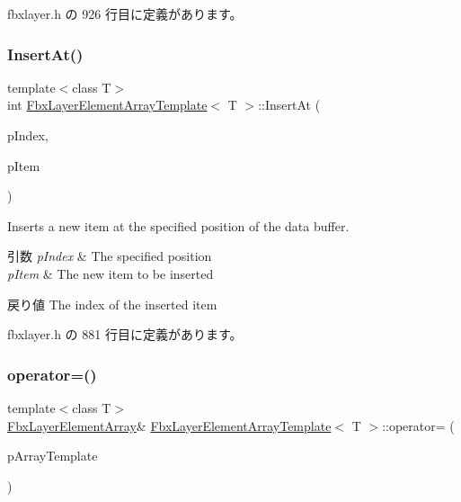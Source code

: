  fbxlayer.\+h の 926 行目に定義があります。

\mbox{\label{class_fbx_layer_element_array_template_adaf1260a3a9f1c68f9809ddaf051ac61}} 
\subsubsection{\texorpdfstring{Insert\+At()}{InsertAt()}}
{\footnotesize\ttfamily template$<$class T$>$ \\
int \hyperlink{class_fbx_layer_element_array_template}{Fbx\+Layer\+Element\+Array\+Template}$<$ T $>$\+::Insert\+At (\begin{DoxyParamCaption}\item[{int}]{p\+Index,  }\item[{T const \&}]{p\+Item }\end{DoxyParamCaption})\hspace{0.3cm}{\ttfamily [inline]}}

Inserts a new item at the specified position of the data buffer. 
\begin{DoxyParams}{引数}
{\em p\+Index} & The specified position \\
\hline
{\em p\+Item} & The new item to be inserted \\
\hline
\end{DoxyParams}
\begin{DoxyReturn}{戻り値}
The index of the inserted item 
\end{DoxyReturn}


 fbxlayer.\+h の 881 行目に定義があります。

\mbox{\label{class_fbx_layer_element_array_template_ae914766602cbb45b38ce26765095f222}} 
\subsubsection{\texorpdfstring{operator=()}{operator=()}\hspace{0.1cm}{\footnotesize\ttfamily [1/2]}}
{\footnotesize\ttfamily template$<$class T$>$ \\
\hyperlink{class_fbx_layer_element_array}{Fbx\+Layer\+Element\+Array}\& \hyperlink{class_fbx_layer_element_array_template}{Fbx\+Layer\+Element\+Array\+Template}$<$ T $>$\+::operator= (\begin{DoxyParamCaption}\item[{const \hyperlink{class_fbx_array}{Fbx\+Array}$<$ T $>$ \&}]{p\+Array\+Template }\end{DoxyParamCaption})\hspace{0.3cm}{\ttfamily [inline]}}

